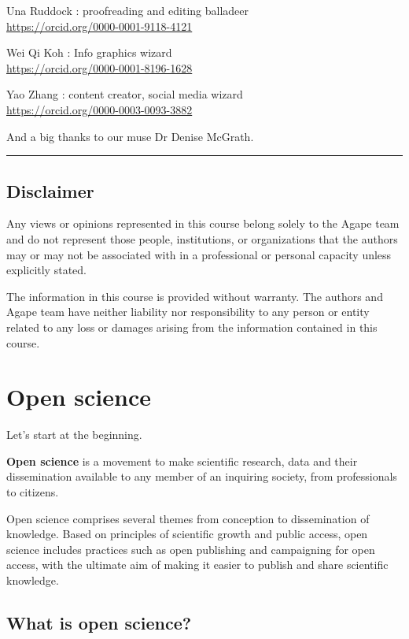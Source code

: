 \documentclass[
]{book}
\begin{document}
Una Ruddock : proofreading and editing balladeer\\
\url{https://orcid.org/0000-0001-9118-4121}

Wei Qi Koh : Info graphics wizard\\
\url{https://orcid.org/0000-0001-8196-1628}

Yao Zhang : content creator, social media wizard\\
\url{https://orcid.org/0000-0003-0093-3882}

And a big thanks to our muse Dr Denise McGrath.

\begin{center}\rule{0.5\linewidth}{0.5pt}\end{center}

\hypertarget{disclaimer}{%
\section*{Disclaimer}\label{disclaimer}}

Any views or opinions represented in this course belong solely to the Agape team and do not represent those people, institutions, or organizations that the authors may or may not be associated with in a professional or personal capacity unless explicitly stated.

The information in this course is provided without warranty. The authors and Agape team have neither liability nor responsibility to any person or entity related to any loss or damages arising from the information contained in this course.

\hypertarget{open-science}{%
\chapter{Open science}\label{open-science}}

Let's start at the beginning.

\textbf{Open science} is a movement to make scientific research, data and their dissemination available to any member of an inquiring society, from professionals to citizens.

Open science comprises several themes from conception to dissemination of knowledge. Based on principles of scientific growth and public access, open science includes practices such as open publishing and campaigning for open access, with the ultimate aim of making it easier to publish and share scientific knowledge.

\hypertarget{what-is-open-science}{%
\section{What is open science?}\label{what-is-open-science}}
\end{document}
